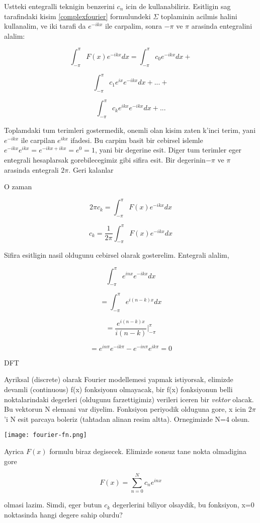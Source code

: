 \documentclass[12pt,fleqn]{article}\usepackage{../common}
\begin{document}
Ustteki entegralli teknigin benzerini $c_n$ icin de kullanabiliriz. Esitligin
sag tarafindaki kisim \ref{complexfourier} formulundeki $\Sigma$ toplaminin
acilmis halini kullanalim, ve iki tarafi da $e^{-ikx}$ ile carpalim, sonra
$-\pi$ ve $\pi$ arasinda entegralini alalim:

\[ \int_{-\pi}^{\pi}F(x)e^{-ikx}dx = \int_{-\pi}^{\pi}c_0e^{-ikx}dx + \]

\[ \int_{-\pi}^{\pi}c_1e^{ix}e^{-ikx}dx + ... +  \]

\[ \int_{-\pi}^{\pi}c_ke^{ikx}e^{-ikx}dx + ... \]

Toplamdaki tum terimleri gostermedik, onemli olan kisim zaten k'inci terim, yani
$e^{-ikx}$ ile carpilan $e^{ikx}$ ifadesi. Bu carpim basit bir cebirsel islemle
$e^{-ikx}e^{ikx} = e^{-ikx + ikx} = e^{0} = 1$, yani bir degerine esit. Diger
tum terimler eger entegrali hesaplarsak gorebilecegimiz gibi sifira esit. Bir
degerinin$-\pi$ ve $\pi$ arasinda entegrali $2\pi$. Geri kalanlar

O zaman

\[ 2\pi c_k = \int_{-\pi}^{\pi}F(x)e^{-ikx}dx \]

\[ c_k = \frac{1}{2\pi}\int_{-\pi}^{\pi}F(x)e^{-ikx}dx \]

Sifira esitligin nasil oldugunu cebirsel olarak gosterelim. Entegrali alalim,

\[ \int_{-\pi}^{\pi}e^{inx}e^{-ikx}dx \]

\[ = \int_{-\pi}^{\pi}e^{i(n-k)x}dx \]

\[ = \frac{e^{i(n-k)x}}{i(n-k)} \bigg|_{-\pi}^{\pi}  \]

\[ = e^{in\pi}e^{-ik\pi} - e^{-in\pi}e^{ik\pi} = 0 \]

DFT

Ayriksal (discrete) olarak Fourier modellemesi yapmak istiyorsak, elimizde
devamli (continuous) f(x) fonksiyonu olmayacak, bir f(x) fonksiyonun belli
noktalarindaki degerleri (oldugunu farzettigimiz) verileri iceren bir {\em
  vektor} olacak. Bu vektorun N elemani var diyelim. Fonksiyon periyodik
olduguna gore, x icin $2\pi$'i N esit parcaya boleriz (tahtadan alinan resim
altta). Ornegimizde N=4 olsun.

\texttt{[image: fourier-fn.png]}

Ayrica $F(x)$ formulu biraz degisecek. Elimizde sonsuz tane nokta olmadigina gore

\[ F(x) = \sum_{n=0}^{N} c_ne^{inx} \]

olmasi lazim. Simdi, eger butun $c_k$ degerlerini biliyor olsaydik, bu
fonksiyon, x=0 noktasinda hangi degere sahip olurdu?
\end{document}
